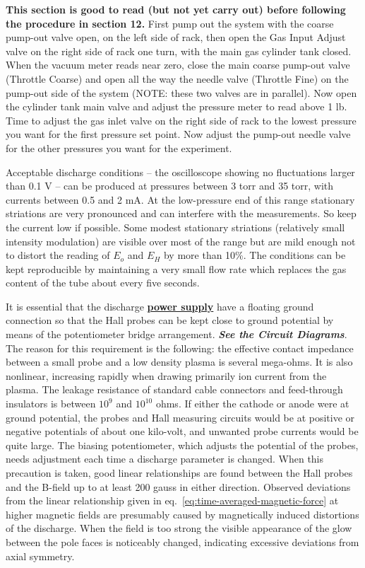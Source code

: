 \documentclass{../lab}
\begin{document}
\textbf{This section is good to read (but not yet carry out) before following the procedure in section 12.} First pump out the system with the coarse pump-out valve open, on the left side of rack, then open the Gas Input Adjust valve on the right side of rack one turn, with the main gas cylinder tank closed. When the vacuum meter reads near zero, close the main coarse pump-out valve (Throttle Coarse) and open all the way the needle valve (Throttle Fine) on the pump-out side of the system (NOTE: these two valves are in parallel). Now open the cylinder tank main valve and adjust the pressure meter to read above 1 lb. Time to adjust the gas inlet valve on the right side of rack to the lowest pressure you want for the first pressure set point. Now adjust the pump-out needle valve for the other pressures you want for the experiment.

Acceptable discharge conditions -- the oscilloscope showing no fluctuations larger than 0.1 V -- can be produced at pressures between 3 torr and 35 torr, with currents between 0.5 and 2 mA. At the low-pressure end of this range stationary striations are very pronounced and can interfere with the measurements. So keep the current low if possible. Some modest stationary striations (relatively small intensity modulation) are visible over most of the range but are mild enough not to distort the reading of $E_o$ and $E_H$ by more than 10\%. The conditions can be kept reproducible by maintaining a very small flow rate which replaces the gas content of the tube about every five seconds.

It is essential that the discharge \href{https://drive.google.com/file/d/1Axsgjlqj_GFDAgpkGJ3Q96b5g8dFa897/view?usp=drive_link}{\textbf{power supply}} have a floating ground connection so that the Hall probes can be kept close to ground potential by means of the potentiometer bridge arrangement. \emph{\textbf{See the Circuit Diagrams}}. The reason for this requirement is the following: the effective contact impedance between a small probe and a low density plasma is several mega-ohms. It is also nonlinear, increasing rapidly when drawing primarily ion current from the plasma. The leakage resistance of standard cable connectors and feed-through insulators is between $10^9$ and $10^{10}$ ohms. If either the cathode or anode were at ground potential, the probes and Hall measuring circuits would be at positive or negative potentials of about one kilo-volt, and unwanted probe currents would be quite large. The biasing potentiometer, which adjusts the potential of the probes, needs adjustment each time a discharge parameter is changed. When this precaution is taken, good linear relationships are found between the Hall probes and the B-field up to at least 200 gauss in either direction. Observed deviations from the linear relationship given in eq.~\eqref{eq:time-averaged-magnetic-force} at higher magnetic fields are presumably caused by magnetically induced distortions of the discharge. When the field is too strong the visible appearance of the glow between the pole faces is noticeably changed, indicating excessive deviations from axial symmetry.
\end{document}
